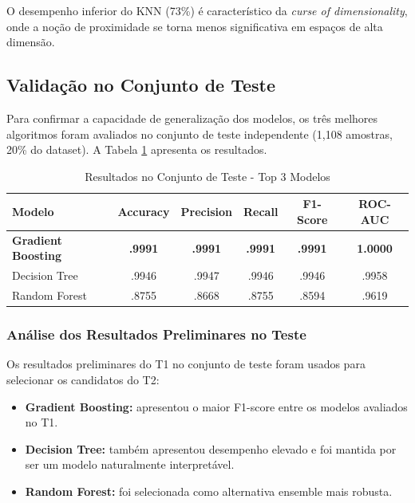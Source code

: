 \documentclass[12pt,a4paper]{article}
\begin{document}
O desempenho inferior do KNN (73\%) é característico da \textit{curse of dimensionality}, onde a noção de proximidade se torna menos significativa em espaços de alta dimensão.

\subsection{Validação no Conjunto de Teste}

Para confirmar a capacidade de generalização dos modelos, os três melhores algoritmos foram avaliados no conjunto de teste independente (1,108 amostras, 20\% do dataset). A Tabela \ref{tab:test_results} apresenta os resultados.

\begin{table}[H]
\centering
\caption{Resultados no Conjunto de Teste - Top 3 Modelos}
\label{tab:test_results}
\small
\begin{tabular}{@{}lccccc@{}}
\toprule
\textbf{Modelo} & \textbf{Accuracy} & \textbf{Precision} & \textbf{Recall} & \textbf{F1-Score} & \textbf{ROC-AUC} \\
\midrule
\textbf{Gradient Boosting} & \textbf{.9991} & \textbf{.9991} & \textbf{.9991} & \textbf{.9991} & \textbf{1.0000} \\
Decision Tree & .9946 & .9947 & .9946 & .9946 & .9958 \\
Random Forest & .8755 & .8668 & .8755 & .8594 & .9619 \\
\bottomrule
\end{tabular}
\end{table}

\subsubsection{Análise dos Resultados Preliminares no Teste}

Os resultados preliminares do T1 no conjunto de teste foram usados para selecionar os candidatos do T2:

\begin{itemize}
    \item \textbf{Gradient Boosting:} apresentou o maior F1-score entre os modelos avaliados no T1.
    
    \item \textbf{Decision Tree:} também apresentou desempenho elevado e foi mantida por ser um modelo naturalmente interpretável.
    
    \item \textbf{Random Forest:} foi selecionada como alternativa ensemble mais robusta.
\end{itemize}
\end{document}
